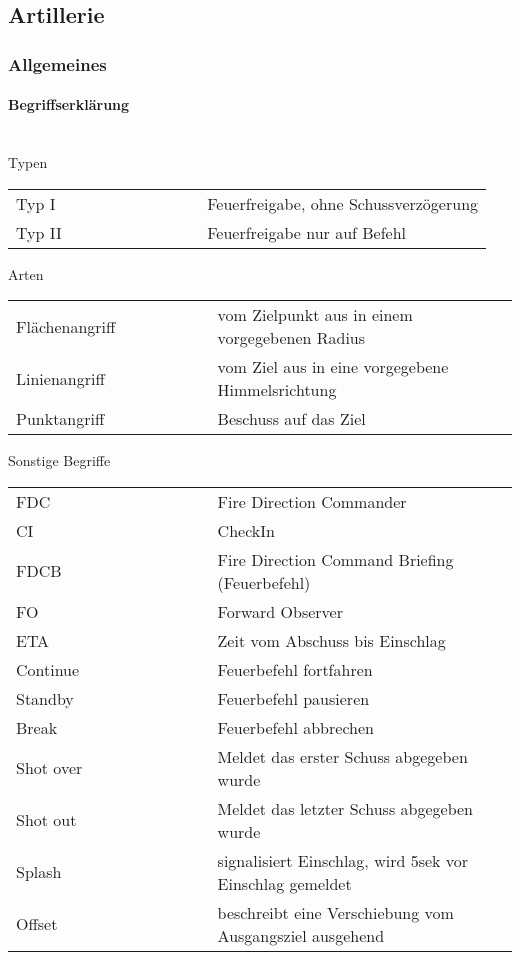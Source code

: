 \newpage
\subsection{Artillerie}
\subsubsection{Allgemeines}
\paragraph{Begriffserklärung} \hfil\\
	Typen
	\begin{longtable}{p{0.4\linewidth} p{0.6\linewidth} }
		Typ I 		& 	Feuerfreigabe, ohne Schussverzögerung \\
		Typ II 		&	Feuerfreigabe nur auf Befehl \\
	\end{longtable}

	Arten
	\begin{longtable}{p{0.4\linewidth} p{0.6\linewidth} }
		Flächenangriff 	&	vom Zielpunkt aus in einem vorgegebenen Radius \\
		Linienangriff 	&	vom Ziel aus in eine vorgegebene Himmelsrichtung \\
		Punktangriff 	&	Beschuss auf das Ziel \\
	\end{longtable}

	Sonstige Begriffe

	\begin{longtable}{p{0.4\linewidth} p{0.6\linewidth}}
		FDC 		&		Fire Direction Commander \\
		CI  		&		CheckIn \\
		FDCB 		&		Fire Direction Command Briefing (Feuerbefehl) \\
		FO  		&		Forward Observer \\
		ETA  		&		Zeit vom Abschuss bis Einschlag \\
		Continue 	&		Feuerbefehl fortfahren \\
		Standby 	&		Feuerbefehl pausieren \\
		Break  		&		Feuerbefehl abbrechen \\
		Shot over  	&		Meldet das erster Schuss abgegeben wurde \\
		Shot out  	&		Meldet das letzter Schuss abgegeben wurde \\
		Splash  	&		signalisiert Einschlag, wird 5sek vor Einschlag gemeldet \\
		Offset  	&		beschreibt eine Verschiebung vom Ausgangsziel ausgehend \\
	\end{longtable}

